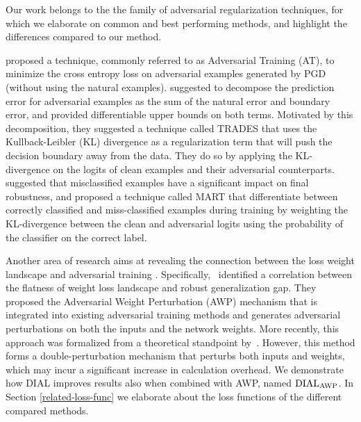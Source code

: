 Our work belongs to the the family of adversarial regularization techniques, for which we elaborate on common and best performing methods, and highlight the differences compared to our method. 

\citet{madry2017towards} proposed a technique, commonly referred to as Adversarial Training (AT), to minimize the cross entropy loss on adversarial examples generated by PGD (without using the natural examples). \citet{zhang2019theoretically}
suggested to decompose the prediction error for adversarial examples as the sum of the natural error and boundary error, and provided differentiable upper bounds on both terms. Motivated by this decomposition, they suggested a technique called TRADES that uses the Kullback-Leibler (KL) divergence as a regularization term that will push the decision boundary away from the data. They do so by applying the KL-divergence on the logits of clean examples and their adversarial counterparts. 
\citet{wang2019improving} suggested that misclassified examples have a significant impact on 
final robustness, and proposed a technique called MART that differentiate between correctly classified and miss-classified examples during training by weighting the KL-divergence between the clean and adversarial logits using the probability of the classifier on the correct label. 

Another area of research aims at revealing the connection between the loss weight landscape
and adversarial training \citep{prabhu2019understanding, yu2018interpreting, wu2020adversarial}. Specifically,~\citet{wu2020adversarial} identified 
a correlation between the flatness of weight loss landscape and robust generalization gap. They proposed
the
Adversarial Weight Perturbation (AWP) mechanism that is integrated into existing adversarial training methods and generates adversarial perturbations on both the inputs and the network weights. More recently, this approach was formalized from a theoretical standpoint by~\citet{tsai2021formalizing}. However, this method forms a double-perturbation mechanism that perturbs both inputs and weights,
which may incur a significant increase in calculation overhead. We demonstrate how DIAL improves results also when combined with AWP, named $\operatorname{DIAL}_{\operatorname{AWP}}$.
In Section \ref{related-loss-func} we elaborate about the loss functions of the different compared methods.

